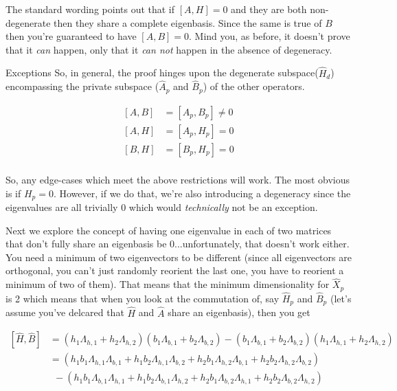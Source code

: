 \begin{answer}
\begin{answerpart}{\ctrois{}}
    The standard wording points out that if $[A,H]=0$ and they are
    both non-degenerate then they share a complete eigenbasis.  Since
    the same is true of $B$ then you're guaranteed to have $[A,B]=0$.
    Mind you, as before, it doesn't prove that it \emph{can} happen,
    only that it \emph{can not} happen in the absence of degeneracy.

\end{answerpart}

  \begin{answerpart}{Exceptions}
    So, in general, the proof hinges upon the degenerate
    subspace($\hat{H}_d$) encompassing the private subspace
    ($\hat{A}_p$ and $\hat{B}_p$) of the other operators.

    \begin{equation}
      \begin{split}
        [A, B] &= [A_p, B_p] \ne 0\\
        [A, H] &= [A_p, H_p] = 0\\
        [B, H] &= [B_p, H_p] = 0\\
      \end{split}
    \end{equation}

    So, any edge-cases which meet the above restrictions will work.
    The most obvious is if $H_p = 0$.  However, if we do that, we're
    also introducing a degeneracy since the eigenvalues are all
    trivially $0$ which would \emph{technically} not be an exception.

    Next we explore the concept of having one eigenvalue in each of
    two matrices that don't fully share an eigenbasis be
    0...unfortunately, that doesn't work either.  You need a minimum
    of two eigenvectors to be different (since all eigenvectors are
    orthogonal, you can't just randomly reorient the last one, you
    have to reorient a minimum of two of them).  That means that the
    minimum dimensionality for $\hat{X}_p$ is 2 which means that when
    you look at the commutation of, say $\hat{H}_p$ and $\hat{B}_p$
    (let's assume you've delcared that $\hat{H}$ and $\hat{A}$ share
    an eigenbasis), then you get

    \begin{equation}
      \begin{split}
        [\hat{H}, \hat{B}]
        &= (h_1\Lambda_{h,1} + h_2\Lambda_{h,2})
        (b_1\Lambda_{b,1} + b_2\Lambda_{b,2})
        - (b_1\Lambda_{b,1} + b_2\Lambda_{b,2})
        (h_1\Lambda_{h,1} + h_2\Lambda_{h,2})\\
        &= (
        h_1b_1\Lambda_{h,1}\Lambda_{b,1}
        + h_1b_2\Lambda_{h,1}\Lambda_{b,2}
        + h_2b_1\Lambda_{h,2}\Lambda_{b,1}
        + h_2b_2\Lambda_{h,2}\Lambda_{b,2})\\
        &\ \ - (
        h_1b_1\Lambda_{b,1}\Lambda_{h,1}
        + h_1b_2\Lambda_{b,1}\Lambda_{h,2}
        + h_2b_1\Lambda_{b,2}\Lambda_{h,1}
        + h_2b_2\Lambda_{b,2}\Lambda_{h,2})\\
      \end{split}
    \end{equation}


\end{answerpart}
\end{answer}
